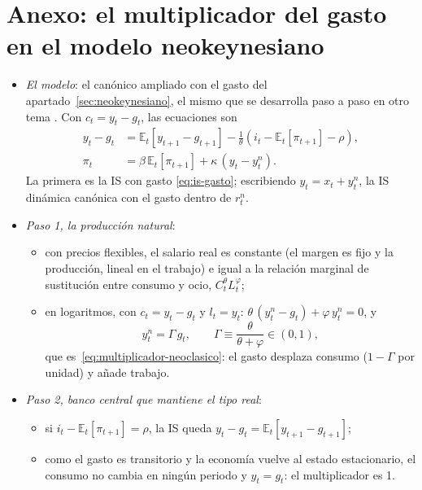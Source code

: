 \documentclass[11pt]{article}
\begin{document}
\clearpage
\appendix

\section{Anexo:\cortetitulo{} el multiplicador del gasto en el modelo neokeynesiano}\label{anexo:derivacion-nek}

\begin{itemize}
\item \emph{El modelo}: el canónico ampliado con el gasto del apartado~\ref{sec:neokeynesiano}, el mismo que se desarrolla paso a paso en otro tema . Con $c_t=y_t-g_t$, las ecuaciones son
  \begin{align}
  y_t-g_t&=\mathbb{E}_t[y_{t+1}-g_{t+1}]-\tfrac{1}{\theta}\left(i_t-\mathbb{E}_t[\pi_{t+1}]-\rho\right), \label{eq:anexo-is}\\
  \pi_t&=\beta\,\mathbb{E}_t[\pi_{t+1}]+\kappa\,(y_t-y^n_t). \label{eq:anexo-nkpc}
  \end{align}
  La primera es la IS con gasto \eqref{eq:is-gasto}; escribiendo $y_t=x_t+y^n_t$, la IS dinámica canónica con el gasto dentro de $r^n_t$.

\item \emph{Paso 1, la producción natural}:
  \begin{itemize}
  \item con precios flexibles, el salario real es constante (el margen es fijo y la producción, lineal en el trabajo) e igual a la relación marginal de sustitución entre consumo y ocio, $C_t^{\theta}L_t^{\varphi}$;
  \item en logaritmos, con $c_t=y_t-g_t$ y $l_t=y_t$: $\theta\,(y^n_t-g_t)+\varphi\,y^n_t=0$, y
    \begin{equation}
    y^n_t=\Gamma\,g_t,\qquad \Gamma\equiv\frac{\theta}{\theta+\varphi}\in(0,1), \label{eq:anexo-natural}
    \end{equation}
    que es~\eqref{eq:multiplicador-neoclasico}: el gasto desplaza consumo ($1-\Gamma$ por unidad) y añade trabajo. \findemo
  \end{itemize}

\item \emph{Paso 2, banco central que mantiene el tipo real}:
  \begin{itemize}
  \item si $i_t-\mathbb{E}_t[\pi_{t+1}]=\rho$, la IS queda $y_t-g_t=\mathbb{E}_t[y_{t+1}-g_{t+1}]$;
  \item como el gasto es transitorio y la economía vuelve al estado estacionario, el consumo no cambia en ningún periodo y $y_t=g_t$: el multiplicador es 1. \findemo
  \end{itemize}


\end{itemize}
\end{document}
